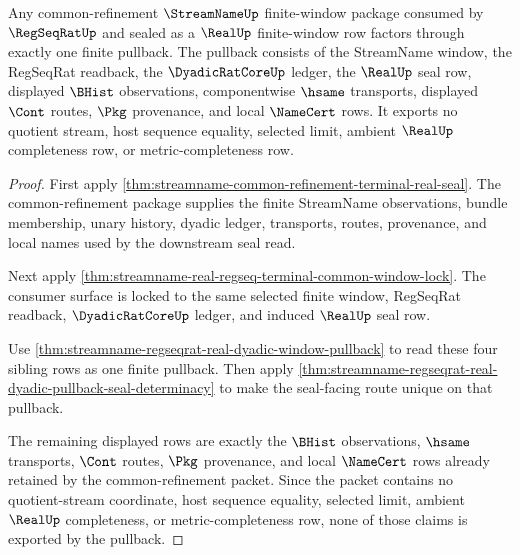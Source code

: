 \begin{theorem}
\label{thm:streamname-real-regseqrat-seal-common-refinement}
Any common-refinement $\StreamNameUp$ finite-window package consumed by $\RegSeqRatUp$ and sealed as a $\RealUp$ finite-window row factors through exactly one finite pullback. The pullback consists of the StreamName window, the RegSeqRat readback, the $\DyadicRatCoreUp$ ledger, the $\RealUp$ seal row, displayed $\BHist$ observations, componentwise $\hsame$ transports, displayed $\Cont$ routes, $\Pkg$ provenance, and local $\NameCert$ rows. It exports no quotient stream, host sequence equality, selected limit, ambient $\RealUp$ completeness row, or metric-completeness row.
\end{theorem}
\begin{proof}
First apply \autoref{thm:streamname-common-refinement-terminal-real-seal}. The common-refinement package supplies the finite StreamName observations, bundle membership, unary history, dyadic ledger, transports, routes, provenance, and local names used by the downstream seal read.

Next apply \autoref{thm:streamname-real-regseq-terminal-common-window-lock}. The consumer surface is locked to the same selected finite window, RegSeqRat readback, $\DyadicRatCoreUp$ ledger, and induced $\RealUp$ seal row.

Use \autoref{thm:streamname-regseqrat-real-dyadic-window-pullback} to read these four sibling rows as one finite pullback. Then apply \autoref{thm:streamname-regseqrat-real-dyadic-pullback-seal-determinacy} to make the seal-facing route unique on that pullback.

The remaining displayed rows are exactly the $\BHist$ observations, $\hsame$ transports, $\Cont$ routes, $\Pkg$ provenance, and local $\NameCert$ rows already retained by the common-refinement packet. Since the packet contains no quotient-stream coordinate, host sequence equality, selected limit, ambient $\RealUp$ completeness, or metric-completeness row, none of those claims is exported by the pullback.
\end{proof}


